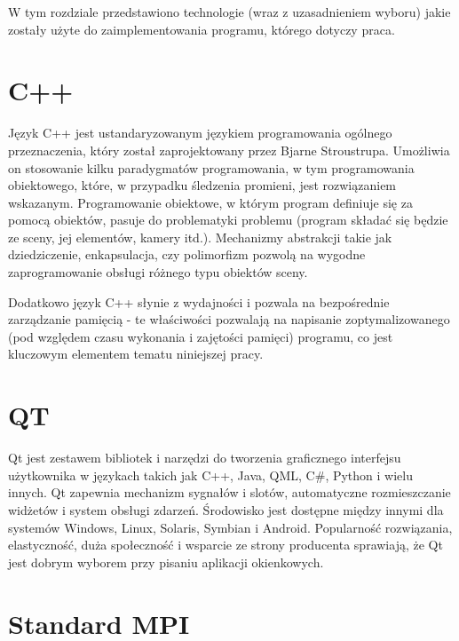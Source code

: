 W tym rozdziale przedstawiono technologie (wraz z uzasadnieniem wyboru) jakie zostały użyte do zaimplementowania programu, którego dotyczy praca.

\section{C++}

Język C++ jest ustandaryzowanym językiem programowania ogólnego przeznaczenia, który został zaprojektowany przez Bjarne Stroustrupa. Umożliwia on stosowanie kilku paradygmatów programowania, w tym programowania obiektowego, które, w przypadku śledzenia promieni, jest rozwiązaniem wskazanym. Programowanie obiektowe, w którym program definiuje się za pomocą obiektów, pasuje do problematyki problemu (program składać się będzie ze sceny, jej elementów, kamery itd.). Mechanizmy abstrakcji takie jak dziedziczenie, enkapsulacja, czy polimorfizm pozwolą na wygodne zaprogramowanie obsługi różnego typu obiektów sceny.

Dodatkowo język C++ słynie z wydajności i pozwala na bezpośrednie zarządzanie pamięcią - te właściwości pozwalają na napisanie zoptymalizowanego (pod względem czasu wykonania i zajętości pamięci) programu, co jest kluczowym elementem tematu niniejszej pracy. 

\section{QT}

Qt jest zestawem bibliotek i narzędzi do tworzenia graficznego interfejsu użytkownika w językach takich jak C++, Java, QML, C\#, Python i wielu innych. Qt zapewnia mechanizm sygnałów i slotów, automatyczne rozmieszczanie widżetów i system obsługi zdarzeń. Środowisko jest dostępne między innymi dla systemów Windows, Linux, Solaris, Symbian i Android. Popularność rozwiązania, elastyczność, duża społeczność i wsparcie ze strony producenta \cite{qt} sprawiają, że Qt jest dobrym wyborem przy pisaniu aplikacji okienkowych.


\section{Standard MPI}


